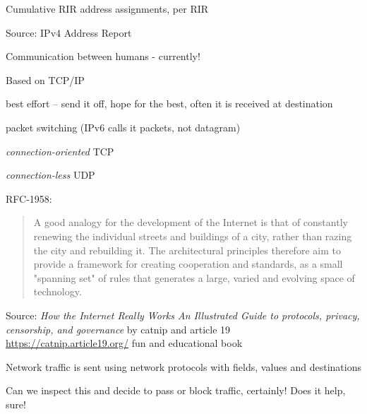 \documentclass[Screen16to9,17pt]{foils}
\begin{document}

\centerline{Cumulative RIR address assignments, per RIR}

\begin{list1}
\item Source:
IPv4 Address Report 
\end{list1}


\begin{list1}
\item Communication between humans - currently!
\item Based on TCP/IP
\begin{list2}
\item best effort -- send it off, hope for the best, often it is received at destination
\item packet switching (IPv6 calls it packets, not datagram)
\item \emph{connection-oriented} TCP
\item \emph{connection-less} UDP
\end{list2}
\end{list1}

RFC-1958:
\begin{quote}
 A good analogy for the development of the Internet is that of
 constantly renewing the individual streets and buildings of a city,
 rather than razing the city and rebuilding it. The architectural
 principles therefore aim to provide a framework for creating
 cooperation and standards, as a small "spanning set" of rules that
 generates a large, varied and evolving space of technology.
\end{quote}




{\small Source: \emph{How the Internet Really Works
An Illustrated Guide to protocols, privacy, censorship, and governance} by catnip and article 19}\\
\url{https://catnip.article19.org/} {\color{red}\faHeart}
fun and educational book





\begin{list2}
\item Network traffic is sent using network protocols with fields, values and destinations
\item Can we inspect this and decide to pass or block traffic, certainly! Does it help, sure!
\end{list2}
\end{document}
